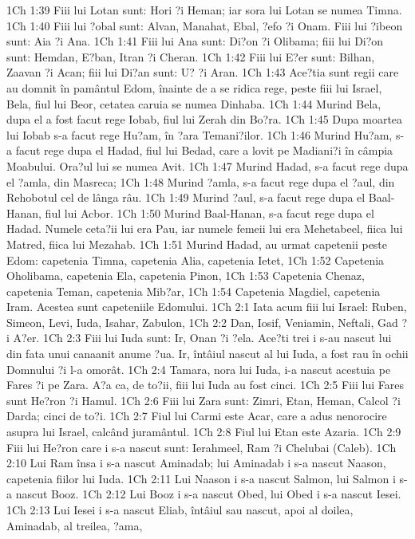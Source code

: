 1Ch 1:39  Fiii lui Lotan sunt: Hori ?i Heman; iar sora lui Lotan se numea Timna.
1Ch 1:40  Fiii lui ?obal sunt: Alvan, Manahat, Ebal, ?efo ?i Onam. Fiii lui ?ibeon sunt: Aia ?i Ana.
1Ch 1:41  Fiii lui Ana sunt: Di?on ?i Olibama; fiii lui Di?on sunt: Hemdan, E?ban, Itran ?i Cheran.
1Ch 1:42  Fiii lui E?er sunt: Bilhan, Zaavan ?i Acan; fiii lui Di?an sunt: U? ?i Aran.
1Ch 1:43  Ace?tia sunt regii care au domnit în pamântul Edom, înainte de a se ridica rege, peste fiii lui Israel, Bela, fiul lui Beor, cetatea caruia se numea Dinhaba.
1Ch 1:44  Murind Bela, dupa el a fost facut rege Iobab, fiul lui Zerah din Bo?ra.
1Ch 1:45  Dupa moartea lui Iobab s-a facut rege Hu?am, în ?ara Temani?ilor.
1Ch 1:46  Murind Hu?am, s-a facut rege dupa el Hadad, fiul lui Bedad, care a lovit pe Madiani?i în câmpia Moabului. Ora?ul lui se numea Avit.
1Ch 1:47  Murind Hadad, s-a facut rege dupa el ?amla, din Masreca;
1Ch 1:48  Murind ?amla, s-a facut rege dupa el ?aul, din Rehobotul cel de lânga râu.
1Ch 1:49  Murind ?aul, s-a facut rege dupa el Baal-Hanan, fiul lui Acbor.
1Ch 1:50  Murind Baal-Hanan, s-a facut rege dupa el Hadad. Numele ceta?ii lui era Pau, iar numele femeii lui era Mehetabeel, fiica lui Matred, fiica lui Mezahab.
1Ch 1:51  Murind Hadad, au urmat capetenii peste Edom: capetenia Timna, capetenia Alia, capetenia Ietet,
1Ch 1:52  Capetenia Oholibama, capetenia Ela, capetenia Pinon,
1Ch 1:53  Capetenia Chenaz, capetenia Teman, capetenia Mib?ar,
1Ch 1:54  Capetenia Magdiel, capetenia Iram. Acestea sunt capeteniile Edomului.
1Ch 2:1  Iata acum fiii lui Israel: Ruben, Simeon, Levi, Iuda, Isahar, Zabulon,
1Ch 2:2  Dan, Iosif, Veniamin, Neftali, Gad ?i A?er.
1Ch 2:3  Fiii lui Iuda sunt: Ir, Onan ?i ?ela. Ace?ti trei i s-au nascut lui din fata unui canaanit anume ?ua. Ir, întâiul nascut al lui Iuda, a fost rau în ochii Domnului ?i l-a omorât.
1Ch 2:4  Tamara, nora lui Iuda, i-a nascut acestuia pe Fares ?i pe Zara. A?a ca, de to?ii, fiii lui Iuda au fost cinci.
1Ch 2:5  Fiii lui Fares sunt He?ron ?i Hamul.
1Ch 2:6  Fiii lui Zara sunt: Zimri, Etan, Heman, Calcol ?i Darda; cinci de to?i.
1Ch 2:7  Fiul lui Carmi este Acar, care a adus nenorocire asupra lui Israel, calcând juramântul.
1Ch 2:8  Fiul lui Etan este Azaria.
1Ch 2:9  Fiii lui He?ron care i s-a nascut sunt: Ierahmeel, Ram ?i Chelubai (Caleb).
1Ch 2:10  Lui Ram însa i s-a nascut Aminadab; lui Aminadab i s-a nascut Naason, capetenia fiilor lui Iuda.
1Ch 2:11  Lui Naason i s-a nascut Salmon, lui Salmon i s-a nascut Booz.
1Ch 2:12  Lui Booz i s-a nascut Obed, lui Obed i s-a nascut Iesei.
1Ch 2:13  Lui Iesei i s-a nascut Eliab, întâiul sau nascut, apoi al doilea, Aminadab, al treilea, ?ama,
